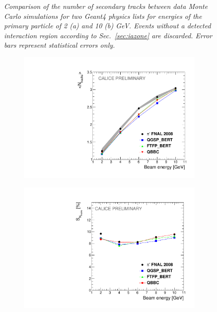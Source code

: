 \begin{figure}
\begin{subfigure}{0.5\textwidth}
		\caption{\label{fig:tr10} }
	\end{subfigure}
	\caption{\label{fig:trackexample} \sl Comparison of the number of secondary tracks between data Monte Carlo simulations for two {\sc Geant}4 physics lists  for energies of the primary particle of 2 (a) and 10 (b) GeV. Events without a detected interaction region according to Sec.~\ref{sec:iazone} are discarded. Error bars represent statistical errors only.}
\end{figure}

\begin{figure}
	\centering
	\begin{subfigure}{0.5\textwidth}
		\centering
		\includegraphics[width=.90\linewidth]{ECAL/plots/ntracks-graph.pdf}
		\caption{\label{fig:tracksgraph} }
	\end{subfigure}%
	\begin{subfigure}{0.5\textwidth}
		\centering
		\includegraphics[width=.90\linewidth]{ECAL/plots/ntracks-graph-delta.pdf}

\end{subfigure}
\end{figure}
